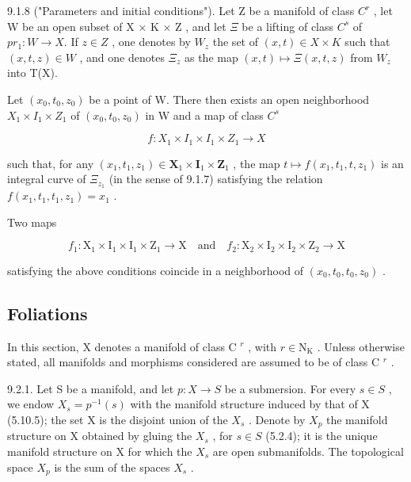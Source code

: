 9.1.8 ("Parameters and initial conditions"). Let Z be a manifold of class \(C^{r}\) , let W be an open subset of X × K × Z , and let \(\Xi\) be a lifting of class \(C^{s}\) of \(pr_{1}: W \to X\). If \(z \in Z\) , one denotes by \(W_{z}\) the set of \((x, t) \in X \times K\) such that \((x, t, z) \in W\) , and one denotes \(\Xi_{z}\) as the map \((x, t) \mapsto \Xi(x, t, z)\) from \(W_{z}\) into T(X).

Let \((x_0, t_0, z_0)\) be a point of W. There then exists an open neighborhood \(X_1 \times I_1 \times Z_1\) of \((x_0, t_0, z_0)\) in W and a map of class \(C^s\)

\[
f \colon X _ {1} \times I _ {1} \times I _ {1} \times Z _ {1} \rightarrow X
\]

such that, for any \((x_{1}, t_{1}, z_{1}) \in \mathbf{X}_{1} \times \mathbf{I}_{1} \times \mathbf{Z}_{1}\) , the map \(t \mapsto f(x_{1}, t_{1}, t, z_{1})\) is an integral curve of \(\Xi_{z_{1}}\) (in the sense of 9.1.7) satisfying the relation \(f(x_{1}, t_{1}, t_{1}, z_{1}) = x_{1}\) .

Two maps

\[
f _ {1}: \mathrm{X} _ {1} \times \mathrm{I} _ {1} \times \mathrm{I} _ {1} \times \mathrm{Z} _ {1} \rightarrow \mathrm{X} \quad \text {and} \quad f _ {2}: \mathrm{X} _ {2} \times \mathrm{I} _ {2} \times \mathrm{I} _ {2} \times \mathrm{Z} _ {2} \rightarrow \mathrm{X}
\]

satisfying the above conditions coincide in a neighborhood of \((x_{0}, t_{0}, t_{0}, z_{0})\) .

\subsection{Foliations}

In this section, X denotes a manifold of class C \(^{r}\) , with \(r \in \mathrm{N}_{\mathrm{K}}\) . Unless otherwise stated, all manifolds and morphisms considered are assumed to be of class C \(^{r}\) .

9.2.1. Let S be a manifold, and let \(p: X \to S\) be a submersion. For every \(s \in S\) , we endow \(X_s = p^{-1}(s)\) with the manifold structure induced by that of X (5.10.5); the set X is the disjoint union of the \(X_s\) . Denote by \(X_p\) the manifold structure on X obtained by gluing the \(X_s\) , for \(s \in S\) (5.2.4); it is the unique manifold structure on X for which the \(X_s\) are open submanifolds. The topological space \(X_p\) is the sum of the spaces \(X_s\) .

